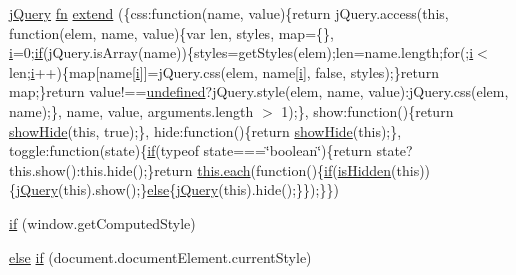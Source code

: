 \begin{DoxyCompactItemize}
\hyperlink{_scripts_2jquery-1_810_82_8js_a41c2e1bff4a6b292938143764e31d789}{j\+Query} \hyperlink{_scripts_2jquery-1_810_82_8min_8js_a37b9e1ceee4c6d2616fa6081784b5468}{fn} \hyperlink{_scripts_2jquery-1_810_82_8js_ad4fdfe428276b642e003de3d604b2735}{extend} (\{css\+:function(name, value)\{return j\+Query.\+access(this, function(elem, name, value)\{var len, styles, map=\{\}, \hyperlink{_scripts_2respond_8min_8js_a5e25b1d1bed9ab5f3174b76d6a722180}{i}=0;\hyperlink{_scripts_2respond_8min_8js_a93851d60dd037a83509a1757b9ee7b66}{if}(j\+Query.\+is\+Array(name))\{styles=get\+Styles(elem);len=name.\+length;for(;\hyperlink{_scripts_2respond_8min_8js_a5e25b1d1bed9ab5f3174b76d6a722180}{i}$<$ len;\hyperlink{_scripts_2respond_8min_8js_a5e25b1d1bed9ab5f3174b76d6a722180}{i}++)\{map\mbox{[}name\mbox{[}\hyperlink{_scripts_2respond_8min_8js_a5e25b1d1bed9ab5f3174b76d6a722180}{i}\mbox{]}\mbox{]}=j\+Query.\+css(elem, name\mbox{[}\hyperlink{_scripts_2respond_8min_8js_a5e25b1d1bed9ab5f3174b76d6a722180}{i}\mbox{]}, false, styles);\}return map;\}return value!==\hyperlink{_scripts_2jquery-1_810_82_8js_a08113a236cc18d2a9d5ce27e638012be}{undefined}?j\+Query.\+style(elem, name, value)\+:j\+Query.\+css(elem, name);\}, name, value, arguments.\+length $>$ 1);\}, show\+:function()\{return \hyperlink{_scripts_2jquery-1_810_82_8js_a002b8e481f3ab2a83194366aceb7a706}{show\+Hide}(this, true);\}, hide\+:function()\{return \hyperlink{_scripts_2jquery-1_810_82_8js_a002b8e481f3ab2a83194366aceb7a706}{show\+Hide}(this);\}, toggle\+:function(state)\{\hyperlink{_scripts_2respond_8min_8js_a93851d60dd037a83509a1757b9ee7b66}{if}(typeof state===\char`\"{}boolean\char`\"{})\{return state?this.\+show()\+:this.\+hide();\}return \hyperlink{_scripts_2jquery-1_810_82_8min_8js_af24c9ea1e34372f8c8b312b35586008d}{this.\+each}(function()\{\hyperlink{_scripts_2respond_8min_8js_a93851d60dd037a83509a1757b9ee7b66}{if}(\hyperlink{_scripts_2jquery-1_810_82_8js_a67ed58d688ff11991ca2826ebfbf28a4}{is\+Hidden}(this))\{\hyperlink{_scripts_2jquery-1_810_82_8js_a41c2e1bff4a6b292938143764e31d789}{j\+Query}(this).show();\}\hyperlink{_scripts_2jquery_8validate_8js_a0544c3fe466e421738dae463968b70ba}{else}\{\hyperlink{_scripts_2jquery-1_810_82_8js_a41c2e1bff4a6b292938143764e31d789}{j\+Query}(this).hide();\}\});\}\})
\item 
\hyperlink{_scripts_2jquery-1_810_82_8js_add3620f254b483a46b557fde577ecbf7}{if} (window.\+get\+Computed\+Style)
\item 
\hyperlink{_scripts_2jquery_8validate_8js_a0544c3fe466e421738dae463968b70ba}{else} \hyperlink{_scripts_2jquery-1_810_82_8js_ac118b48e1947a1d7c85fefbdad49502e}{if} (document.\+document\+Element.\+current\+Style)

\end{DoxyCompactItemize}
